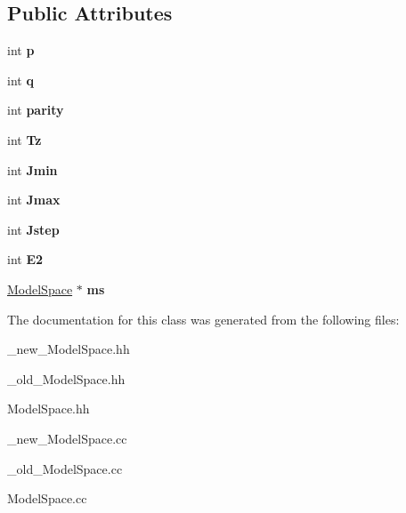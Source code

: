 \subsection*{Public Attributes}
\begin{DoxyCompactItemize}
\item 
\hypertarget{classKet_a3120fbd6d28583a0e06d6426e0e69c83}{int {\bfseries p}}\label{classKet_a3120fbd6d28583a0e06d6426e0e69c83}

\item 
\hypertarget{classKet_afd050bca27dacccd2637266804b4d710}{int {\bfseries q}}\label{classKet_afd050bca27dacccd2637266804b4d710}

\item 
\hypertarget{classKet_a4a0681d5510440adda8a1b8381cf9152}{int {\bfseries parity}}\label{classKet_a4a0681d5510440adda8a1b8381cf9152}

\item 
\hypertarget{classKet_ab5dfa76647fc103d1c97ae349a6353e7}{int {\bfseries Tz}}\label{classKet_ab5dfa76647fc103d1c97ae349a6353e7}

\item 
\hypertarget{classKet_ae042513fd7d35c7edd185d86ef961a00}{int {\bfseries Jmin}}\label{classKet_ae042513fd7d35c7edd185d86ef961a00}

\item 
\hypertarget{classKet_a9ef8bcb06beb06198fc12d194e7a379e}{int {\bfseries Jmax}}\label{classKet_a9ef8bcb06beb06198fc12d194e7a379e}

\item 
\hypertarget{classKet_a81376ef212f38628ad2aa913825052f3}{int {\bfseries Jstep}}\label{classKet_a81376ef212f38628ad2aa913825052f3}

\item 
\hypertarget{classKet_af0cd4574c48941fb396ef7a2e467cc90}{int {\bfseries E2}}\label{classKet_af0cd4574c48941fb396ef7a2e467cc90}

\item 
\hypertarget{classKet_ab9572b97dc6b65366c0836bc5224d1e8}{\hyperlink{classModelSpace}{Model\-Space} $\ast$ {\bfseries ms}}\label{classKet_ab9572b97dc6b65366c0836bc5224d1e8}

\end{DoxyCompactItemize}


The documentation for this class was generated from the following files\-:\begin{DoxyCompactItemize}
\item 
\-\_\-new\-\_\-\-Model\-Space.\-hh\item 
\-\_\-old\-\_\-\-Model\-Space.\-hh\item 
Model\-Space.\-hh\item 
\-\_\-new\-\_\-\-Model\-Space.\-cc\item 
\-\_\-old\-\_\-\-Model\-Space.\-cc\item 
Model\-Space.\-cc\end{DoxyCompactItemize}
